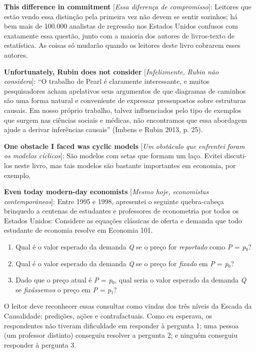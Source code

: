 \documentclass[11pt,a5paper,twoside]{book}
\begin{document}
\textbf{This difference in commitment} [\textit{Essa diferença de compromisso}]: Leitores que estão vendo essa distinção pela primeira vez não devem se sentir sozinhos; há bem mais de 100.000 analistas de regressão nos Estados Unidos confusos com exatamente essa questão, junto com a maioria dos autores de livros-texto de estatística. As coisas só mudarão quando os leitores deste livro cobrarem esses autores.

\textbf{Unfortunately, Rubin does not consider} [\textit{Infelizmente, Rubin não considera}]: “O trabalho de Pearl é claramente interessante, e muitos pesquisadores acham apelativos seus argumentos de que diagramas de caminhos são uma forma natural e conveniente de expressar pressupostos sobre estruturas causais. Em nosso próprio trabalho, talvez influenciados pelo tipo de exemplos que surgem nas ciências sociais e médicas, não encontramos que essa abordagem ajude a derivar inferências causais” (Imbens e Rubin 2013, p. 25).

\textbf{One obstacle I faced was cyclic models} [\textit{Um obstáculo que enfrentei foram os modelos cíclicos}]: São modelos com setas que formam um laço. Evitei discuti-los neste livro, mas tais modelos são bastante importantes em economia, por exemplo.

\textbf{Even today modern-day economists} [\textit{Mesmo hoje, economistas contemporâneos}]: Entre 1995 e 1998, apresentei o seguinte quebra-cabeça brinquedo a centenas de estudantes e professores de econometria por todos os Estados Unidos: Considere as equações clássicas de oferta e demanda que todo estudante de economia resolve em Economia 101.

\begin{enumerate}
\item Qual é o valor esperado da demanda \textit{Q} se o preço for \textit{reportado} como \textit{P} = \textit{p}₀?
\item Qual é o valor esperado da demanda \textit{Q} se o preço for \textit{fixado} em \textit{P} = \textit{p}₀?
\item Dado que o preço atual é \textit{P} = \textit{p}₀, qual seria o valor esperado da demanda \textit{Q} se \textit{fixássemos} o preço em \textit{P} = \textit{p}₁?
\end{enumerate}
O leitor deve reconhecer essas consultas como vindas dos três níveis da Escada da Causalidade: predições, ações e contrafactuais. Como eu esperava, os respondentes não tiveram dificuldade em responder à pergunta 1; uma pessoa (um professor distinto) conseguiu resolver a pergunta 2; e ninguém conseguiu responder à pergunta 3.
\end{document}

